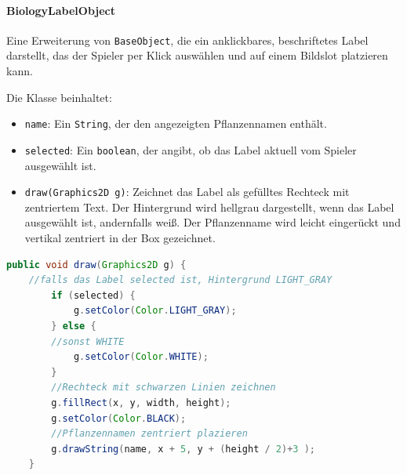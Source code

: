 \paragraph{BiologyLabelObject}
Eine Erweiterung von \texttt{BaseObject}, die ein anklickbares, beschriftetes Label darstellt, das der Spieler per Klick auswählen und auf einem Bildslot platzieren kann.

Die Klasse beinhaltet:
\begin{sloppypar}
    \begin{itemize}
        \item \texttt{name}: Ein \texttt{String}, der den angezeigten Pflanzennamen enthält.
        \item \texttt{selected}: Ein \texttt{boolean}, der angibt, ob das Label aktuell vom Spieler ausgewählt ist.
        \item \texttt{draw(Graphics2D g)}: Zeichnet das Label als gefülltes Rechteck mit zentriertem Text. Der Hintergrund wird hellgrau dargestellt, wenn das Label ausgewählt ist, andernfalls weiß. Der Pflanzenname wird leicht eingerückt und vertikal zentriert in der Box gezeichnet.
    \end{itemize}
\end{sloppypar}

\begin{lstlisting}[caption=Zeichen des Labels, abhängig vom Zustand, label=lst:mgDrawLabel, captionpos=t, language=Java]
    public void draw(Graphics2D g) {
    //falls das Label selected ist, Hintergrund LIGHT_GRAY
        if (selected) {
            g.setColor(Color.LIGHT_GRAY);
        } else {
        //sonst WHITE
            g.setColor(Color.WHITE);
        }
        //Rechteck mit schwarzen Linien zeichnen
        g.fillRect(x, y, width, height);
        g.setColor(Color.BLACK);
        //Pflanzennamen zentriert plazieren
        g.drawString(name, x + 5, y + (height / 2)+3 );
    }
\end{lstlisting}

